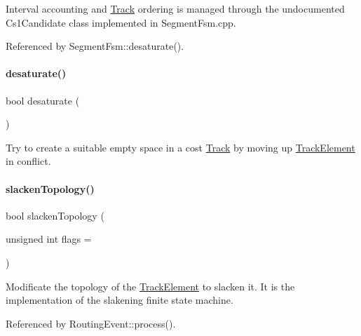 Interval accounting and \hyperlink{classKite_1_1Track}{Track} ordering is managed through the undocumented {\ttfamily Cs1\+Candidate} class implemented in {\ttfamily Segment\+Fsm.\+cpp}.

 

Referenced by Segment\+Fsm\+::desaturate().

\mbox{\label{classKite_1_1SegmentFsm_a0b8e8be9d7c9501be9534d3c2a9dd586}} 
\paragraph{\texorpdfstring{desaturate()}{desaturate()}}
{\footnotesize\ttfamily bool desaturate (\begin{DoxyParamCaption}{ }\end{DoxyParamCaption})}

Try to create a suitable empty space in a cost \hyperlink{classKite_1_1Track}{Track} by moving up \hyperlink{classKite_1_1TrackElement}{Track\+Element} in conflict. \mbox{\label{classKite_1_1SegmentFsm_a623d68f599c0de60cdd36af3f183e6f1}} 
\paragraph{\texorpdfstring{slacken\+Topology()}{slackenTopology()}}
{\footnotesize\ttfamily bool slacken\+Topology (\begin{DoxyParamCaption}\item[{unsigned int}]{flags = {} }\end{DoxyParamCaption})}

Modificate the topology of the \hyperlink{classKite_1_1TrackElement}{Track\+Element} to slacken it. It is the implementation of the slakening finite state machine. 

Referenced by Routing\+Event\+::process().

\mbox{\label{classKite_1_1SegmentFsm_ab8ae818baad1d0a274a7e8c308ca3f92}} 
